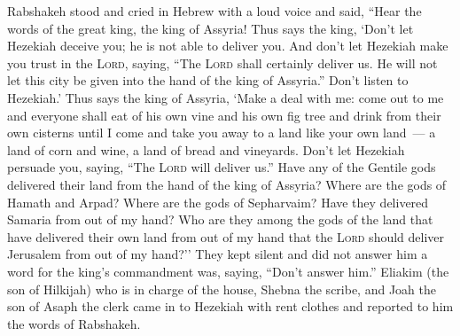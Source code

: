 \begin{inparaenum}
   Rabshakeh stood and cried in Hebrew with a loud voice and said, ``Hear the words of the great king, the king of Assyria!%
   Thus says the king, `Don't let Hezekiah deceive you; he is not able to deliver you.%
   And don't let Hezekiah make you trust in the \textsc{Lord}, saying, ``The \textsc{Lord} shall certainly deliver us. He will not let this city be given into the hand of the king of Assyria.''%
   Don't listen to Hezekiah.' Thus says the king of Assyria, `Make a deal with me: come out to me and everyone shall eat of his own vine and his own fig tree and drink from their own cisterns%
   until I come and take you away to a land like your own land~--- a land of corn and wine, a land of bread and vineyards.%
   Don't let Hezekiah persuade you, saying, ``The \textsc{Lord} will deliver us.'' Have any of the Gentile gods delivered their land from the hand of the king of Assyria?%
   Where are the gods of Hamath and Arpad? Where are the gods of Sepharvaim? Have they delivered Samaria from out of my hand?%
   Who are they among the gods of the land that have delivered their own land from out of my hand that the \textsc{Lord} should deliver Jerusalem from out of my hand?''%
   They kept silent and did not answer him a word for the king's commandment was, saying, ``Don't answer him.''%
   Eliakim (the son of Hilkijah) who is in charge of the house, Shebna the scribe, and Joah the son of Asaph the clerk came in to Hezekiah with rent clothes and reported to him the words of Rabshakeh.%
\end{inparaenum}
